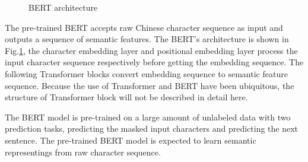 \documentclass[a4paper]{article}
\begin{document}
\begin{figure}[t]
	\caption{BERT architecture}
	\label{fig:bert}
\end{figure}

The pre-trained BERT accepts raw Chinese character sequence as input and outputs a sequence of semantic features. The BERT's architecture is shown in Fig.\ref{fig:bert}, the character embedding layer and positional embedding layer process the input character sequence respectively before getting the embedding sequence. The following Transformer blocks convert embedding sequence to semantic feature sequence. Because the use of Transformer \cite{vaswani2017attention} and BERT have been ubiquitous, the structure of Transformer block will not be described in detail here.

The BERT model is pre-trained on a large amount of unlabeled data with two prediction tasks, predicting the masked input characters and predicting the next sentence. The pre-trained BERT model is expected to learn semantic representings from raw character sequence.
\end{document}

